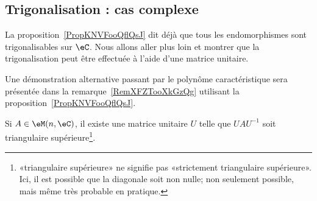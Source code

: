 \subsection{Trigonalisation : cas complexe}

La proposition~\ref{PropKNVFooQflQsJ} dit déjà que tous les endomorphismes sont trigonalisables sur \( \eC\). Nous allons aller plus loin et montrer que la trigonalisation peut être effectuée à l'aide d'une matrice unitaire.

Une démonstration alternative passant par le polynôme caractéristique sera présentée dans la remarque~\ref{RemXFZTooXkGzQg} utilisant la proposition~\ref{PropKNVFooQflQsJ}.
\begin{lemma}  \label{LemSchurComplHAftTq}
    Si \( A\in\eM(n,\eC)\), il existe une matrice unitaire \( U\) telle que \( UAU^{-1}\) soit triangulaire supérieure\footnote{«triangulaire supérieure» ne signifie pas «strictement triangulaire supérieure». Ici, il est possible que la diagonale soit non nulle; non seulement possible, mais même très probable en pratique.}.
\end{lemma}

